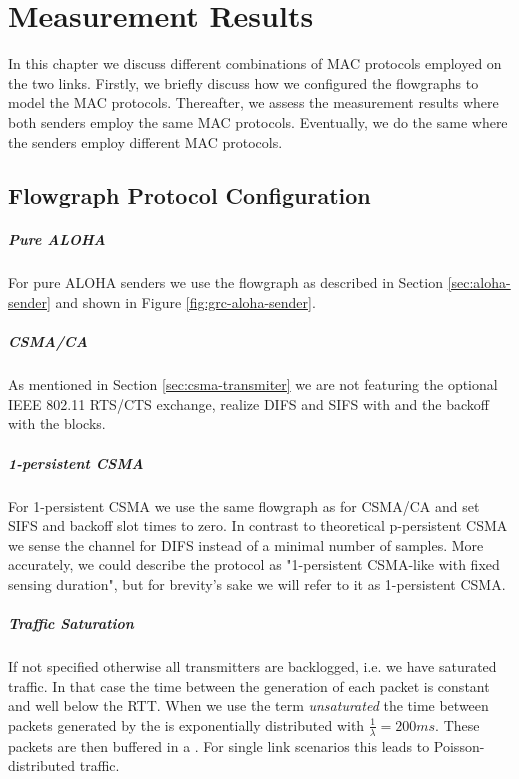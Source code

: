\chapter{Measurement Results}

In this chapter we discuss different combinations of MAC protocols employed on the two links. Firstly, we briefly discuss how we configured the flowgraphs to model the MAC protocols. Thereafter, we assess the measurement results where both senders employ the same MAC protocols. Eventually, we do the same where the senders employ different MAC protocols. 

\section{Flowgraph Protocol Configuration}

\paragraph{Pure ALOHA}
For pure ALOHA senders we use the flowgraph as described in Section \ref{sec:aloha-sender} and shown in Figure \ref{fig:grc-aloha-sender}. 

\paragraph{CSMA/CA}
As mentioned in Section \ref{sec:csma-transmiter} we are not featuring the optional IEEE 802.11 RTS/CTS exchange, realize DIFS and SIFS with  and the backoff with the  blocks.

\paragraph{1-persistent CSMA}
For 1-persistent CSMA we use the same flowgraph as for CSMA/CA and set SIFS and backoff slot times to zero. In contrast to theoretical p-persistent CSMA we sense the channel for DIFS instead of a minimal number of samples. More accurately, we could describe the protocol as "1-persistent CSMA-like with fixed sensing duration", but for brevity's sake we will refer to it as 1-persistent CSMA.  
 
\paragraph{Traffic Saturation}
If not specified otherwise all transmitters are backlogged, i.e. we have saturated traffic. In that case the time between the generation of each packet is constant and well below the RTT. When we use the term \emph{unsaturated} the time between packets generated by the  is exponentially distributed with $\frac{1}{\lambda}=200ms$. These packets are then buffered in a . For single link scenarios this leads to Poisson-distributed traffic. 

